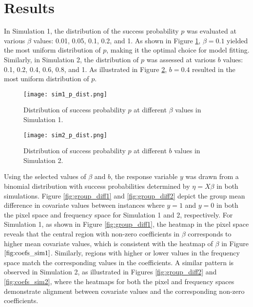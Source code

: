 \documentclass[12pt]{article}
\begin{document}
\section*{Results}

In Simulation 1, the distribution of the success probability \( p \) was evaluated at various \( \beta \) values: 0.01,
0.05, 0.1, 0.2, and 1. As shown in Figure \ref{fig:sim1_p_dist}, \( \beta = 0.1 \) yielded the most uniform distribution
of \( p \), making it the optimal choice for model fitting. Similarly, in Simulation 2, the distribution of \( p \) was assessed at various \( b \) values: 0.1, 0.2, 0.4, 0.6, 0.8,
and 1. As illustrated in Figure \ref{fig:sim2_p_dist}, \( b = 0.4 \) resulted in the most uniform distribution of \( p
\). 

\begin{figure}[htbp] 
	\centering
	\texttt{[image: sim1\_p\_dist.png]} 
  \caption{Distribution of success probability \( p \) at different \( \beta \) values in Simulation 1.}
	\label{fig:sim1_p_dist} 
\end{figure}

\begin{figure}[htbp] 
	\centering
	\texttt{[image: sim2\_p\_dist.png]} 
  \caption{Distribution of success probability \( p \) at different \( b \) values in Simulation 2.}
	\label{fig:sim2_p_dist} 
\end{figure}

Using the selected values of \( \beta \) and \( b \), the response variable \( y \) was drawn from a binomial distribution with
success probabilities determined by \( \eta = X \beta \) in both simulations. Figure \ref{fig:group_diff1} and
\ref{fig:group_diff2} depict the group mean difference in covariate values between instances where \( y = 1 \) and \( y = 0
\) in both the pixel space and frequency space for Simulation 1 and 2, respectively. For Simulation 1, as shown in Figure \ref{fig:group_diff1}, the heatmap in the pixel space reveals that the central
region with non-zero coefficients in \( \beta \) corresponds to higher mean covariate values, which is consistent with
the heatmap of \( \beta \) in Figure \( \ref{fig:coefs_sim1} \). Similarly, regions with higher or lower values in the
frequency space match the corresponding values in the coefficients. A similar pattern is observed in Simulation 2, as illustrated in Figures \ref{fig:group_diff2} and \ref{fig:coefs_sim2},
where the heatmaps for both the pixel and frequency spaces demonstrate alignment between covariate values and the
corresponding non-zero coefficients. 
\end{document}
